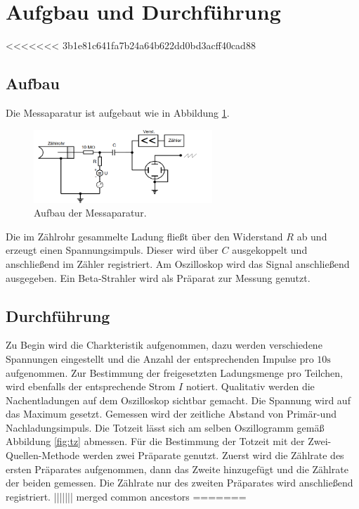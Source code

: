 \section{Aufgbau und Durchführung}
\label{sec:Durchführung}
<<<<<<< 3b1e81c641fa7b24a64b622dd0bd3acff40cad88
\subsection{Aufbau}
Die Messaparatur ist aufgebaut wie in Abbildung \ref{fig:aufbau}.
\begin{figure}
  \centering
  \includegraphics[width=0.6\textwidth]{aufbau.PNG}
  \caption{Aufbau der Messaparatur.}
  \label{fig:aufbau}
\end{figure}
Die im Zählrohr gesammelte Ladung fließt über den Widerstand $R$ ab und erzeugt einen Spannungsimpuls. Dieser wird über $C$ ausgekoppelt und
anschließend im Zähler registriert. Am Oszilloskop wird das Signal anschließend ausgegeben. Ein Beta-Strahler wird als Präparat
zur Messung genutzt.
\subsection{Durchführung}
Zu Begin wird die Charkteristik aufgenommen, dazu werden verschiedene Spannungen eingestellt und die Anzahl der entsprechenden
Impulse pro $10\si{\second}$ aufgenommen. Zur Bestimmung der freigesetzten Ladungsmenge pro Teilchen, wird ebenfalls der entsprechende
Strom $I$ notiert.
Qualitativ werden die Nachentladungen auf dem Oszilloskop sichtbar gemacht. Die Spannung wird auf das Maximum gesetzt. Gemessen
wird der zeitliche Abstand von Primär-und Nachladungsimpuls. Die Totzeit lässt sich am selben
Oszillogramm gemäß Abbildung \ref{fig:tz} abmessen.
Für die Bestimmung der Totzeit mit der Zwei-Quellen-Methode werden zwei Präparate genutzt. Zuerst wird die Zählrate
des ersten Präparates aufgenommen, dann das Zweite hinzugefügt und die Zählrate der beiden gemessen. Die Zählrate nur des zweiten Präparates
wird anschließend registriert.
||||||| merged common ancestors
=======
